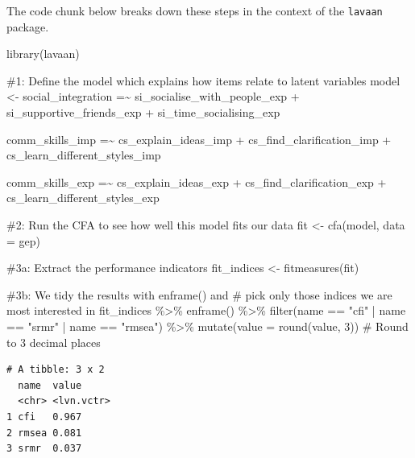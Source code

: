 \documentclass[
  letterpaper,
]{krantz}
\makeatletter
\newenvironment{Shaded}{\begin{snugshade}}{\end{snugshade}}
\newcommand{\AttributeTok}[1]{\textcolor[rgb]{0.40,0.45,0.13}{#1}}
\newcommand{\CommentTok}[1]{\textcolor[rgb]{0.37,0.37,0.37}{#1}}
\newcommand{\DecValTok}[1]{\textcolor[rgb]{0.68,0.00,0.00}{#1}}
\newcommand{\FunctionTok}[1]{\textcolor[rgb]{0.28,0.35,0.67}{#1}}
\newcommand{\NormalTok}[1]{\textcolor[rgb]{0.00,0.23,0.31}{#1}}
\newcommand{\OtherTok}[1]{\textcolor[rgb]{0.00,0.23,0.31}{#1}}
\newcommand{\SpecialCharTok}[1]{\textcolor[rgb]{0.37,0.37,0.37}{#1}}
\newcommand{\StringTok}[1]{\textcolor[rgb]{0.13,0.47,0.30}{#1}}
\newenvironment{kframe}{%
\medskip{}
\setlength{\fboxsep}{.8em}
 \def\at@end@of@kframe{}%
 \ifinner\ifhmode%
  \def\at@end@of@kframe{\end{minipage}}%
  \begin{minipage}{\columnwidth}%
 \fi\fi%
 \def\FrameCommand##1{\hskip\@totalleftmargin \hskip-\fboxsep
 \colorbox{shadecolor}{##1}\hskip-\fboxsep
     \hskip-\linewidth \hskip-\@totalleftmargin \hskip\columnwidth}%
 \MakeFramed {\advance\hsize-\width
   \@totalleftmargin\z@ \linewidth\hsize
   \@setminipage}}%
 {\par\unskip\endMakeFramed%
 \at@end@of@kframe}
\renewenvironment{Shaded}{\begin{kframe}}{\end{kframe}}
\makeatother
\begin{document}
The code chunk below breaks down these steps in the context of the
\texttt{lavaan} package.

\begin{Shaded}
\begin{Highlighting}[]
\FunctionTok{library}\NormalTok{(lavaan)}

\CommentTok{\#1: Define the model which explains how items relate to latent variables}
\NormalTok{model }\OtherTok{\textless{}{-}} \StringTok{\textquotesingle{}}
\StringTok{social\_integration =\textasciitilde{}}
\StringTok{si\_socialise\_with\_people\_exp +}
\StringTok{si\_supportive\_friends\_exp +}
\StringTok{si\_time\_socialising\_exp}

\StringTok{comm\_skills\_imp =\textasciitilde{}}
\StringTok{cs\_explain\_ideas\_imp +}
\StringTok{cs\_find\_clarification\_imp +}
\StringTok{cs\_learn\_different\_styles\_imp}

\StringTok{comm\_skills\_exp =\textasciitilde{}}
\StringTok{cs\_explain\_ideas\_exp +}
\StringTok{cs\_find\_clarification\_exp +}
\StringTok{cs\_learn\_different\_styles\_exp}
\StringTok{\textquotesingle{}}

\CommentTok{\#2: Run the CFA to see how well this model fits our data}
\NormalTok{fit }\OtherTok{\textless{}{-}} \FunctionTok{cfa}\NormalTok{(model, }\AttributeTok{data =}\NormalTok{ gep)}

\CommentTok{\#3a: Extract the performance indicators}
\NormalTok{fit\_indices }\OtherTok{\textless{}{-}} \FunctionTok{fitmeasures}\NormalTok{(fit)}

\CommentTok{\#3b: We tidy the results with enframe() and}
\CommentTok{\#    pick only those indices we are most interested in}
\NormalTok{fit\_indices }\SpecialCharTok{\%\textgreater{}\%}
  \FunctionTok{enframe}\NormalTok{() }\SpecialCharTok{\%\textgreater{}\%}
  \FunctionTok{filter}\NormalTok{(name }\SpecialCharTok{==} \StringTok{"cfi"} \SpecialCharTok{|}
\NormalTok{         name }\SpecialCharTok{==} \StringTok{"srmr"} \SpecialCharTok{|}
\NormalTok{         name }\SpecialCharTok{==} \StringTok{"rmsea"}\NormalTok{) }\SpecialCharTok{\%\textgreater{}\%}
  \FunctionTok{mutate}\NormalTok{(}\AttributeTok{value =} \FunctionTok{round}\NormalTok{(value, }\DecValTok{3}\NormalTok{))   }\CommentTok{\# Round to 3 decimal places}
\end{Highlighting}
\end{Shaded}

\begin{verbatim}
# A tibble: 3 x 2
  name  value     
  <chr> <lvn.vctr>
1 cfi   0.967     
2 rmsea 0.081     
3 srmr  0.037     
\end{verbatim}
\end{document}
